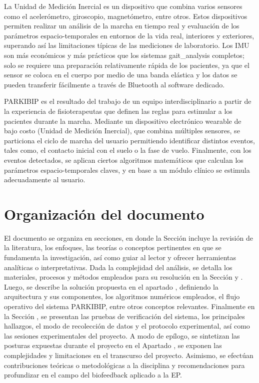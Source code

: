 La Unidad de Medición Inercial es un dispositivo que combina varios sensores como el acelerómetro, giroscopio, magnetómetro, entre otros. Estos dispositivos permiten realizar un análisis de la marcha en tiempo real y evaluación de los parámetros espacio-temporales en entornos de la vida real, interiores y exteriores, superando así las limitaciones típicas de las mediciones de laboratorio. Los IMU son más económicos y más prácticos que los sistemas \gls{gait_analysis} completos; solo se requiere una preparación relativamente rápida de los pacientes, ya que el sensor se coloca en el cuerpo por medio de una banda elástica y los datos se pueden transferir fácilmente a través de Bluetooth al software dedicado.

PARKIBIP es el resultado del trabajo de un equipo interdisciplinario a partir de la experiencia de fisioterapeutas que definen las reglas para estimular a los pacientes durante la marcha. Mediante un dispositivo electrónico wearable de bajo costo (Unidad de Medición Inercial), que combina múltiples sensores, se particiona el ciclo de marcha del usuario permitiendo identificar distintos eventos, tales como, el contacto inicial con el suelo o la fase de vuelo. Finalmente, con los eventos detectados, se aplican ciertos algoritmos matemáticos que calculan los parámetros espacio-temporales claves, y en base a un módulo clínico se estimula adecuadamente al usuario. 

\section{Organización del documento}

El documento se organiza en secciones, en donde la Sección  incluye la revisión de la literatura, los enfoques, las teorías o conceptos pertinentes en que se fundamenta la investigación, así como guiar al lector y ofrecer herramientas analíticas o interpretativas. Dada la complejidad del análisis, se detalla los materiales, procesos y métodos empleados para su resolución en la Sección  y . Luego, se describe la solución propuesta en el apartado , definiendo la arquitectura y sus componentes, los algoritmos numéricos empleados, el flujo operativo del sistema PARKIBIP, entre otros conceptos relevantes. Finalmente en la Sección , se presentan las pruebas de verificación del sistema, los principales hallazgos, el modo de recolección de datos y el protocolo experimental, así como las sesiones experimentales del proyecto. A modo de epílogo, se sintetizan las posturas expuestas durante el proyecto en el Apartado , se exponen las complejidades y limitaciones en el transcurso del proyecto. Asimismo, se efectúan contribuciones teóricas o metodológicas a la disciplina y recomendaciones para profundizar en el campo del biofeedback aplicado a la EP.
